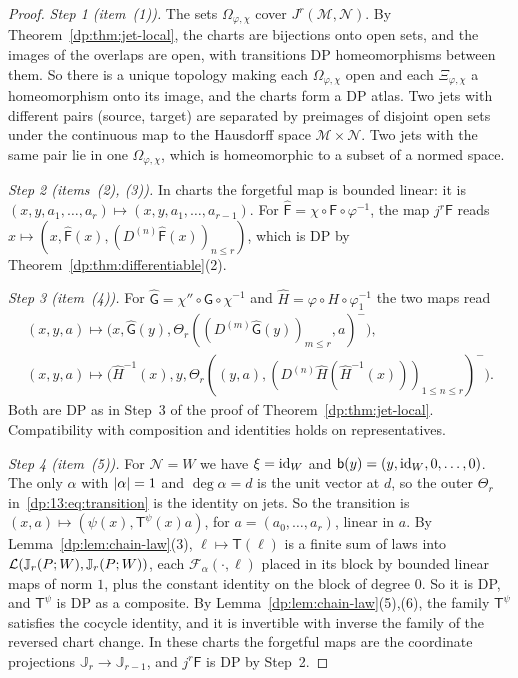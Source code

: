 \begin{proof}
\emph{Step 1 (item~(1)).} The sets $\Omega_{\varphi,\chi}$ cover $J^r(\mathcal M,\mathcal N)$. By Theorem~\ref{dp:thm:jet-local}, the charts are bijections onto open sets, and the images of the overlaps are open, with transitions DP homeomorphisms between them. So there is a unique topology making each $\Omega_{\varphi,\chi}$ open and each $\Xi_{\varphi,\chi}$ a homeomorphism onto its image, and the charts form a DP atlas. Two jets with different pairs (source, target) are separated by preimages of disjoint open sets under the continuous map to the Hausdorff space $\mathcal M\times\mathcal N$. Two jets with the same pair lie in one $\Omega_{\varphi,\chi}$, which is homeomorphic to a subset of a normed space.

\emph{Step 2 (items~(2), (3)).} In charts the forgetful map is bounded linear: it is $(x,y,a_1,\dots,a_r)\mapsto(x,y,a_1,\dots,a_{r-1})$. For $\hat{\mathsf F}=\chi\circ\mathsf F\circ\varphi^{-1}$, the map $j^r\mathsf F$ reads $x\mapsto(x,\hat{\mathsf F}(x),(D^{(n)}\hat{\mathsf F}(x))_{n\le r})$, which is DP by Theorem~\ref{dp:thm:differentiable}(2).

\emph{Step 3 (item~(4)).} For $\hat{\mathsf G}=\chi''\circ\mathsf G\circ\chi^{-1}$ and $\hat H=\varphi\circ H\circ\varphi_1^{-1}$ the two maps read
\begin{gather*}
 (x,y,a)\mapsto\bigl(x,\hat{\mathsf G}(y),\Theta_r((D^{(m)}\hat{\mathsf G}(y))_{m\le r},a)^-\bigr),\\
 (x,y,a)\mapsto\bigl(\hat H^{-1}(x),y,\Theta_r((y,a),(D^{(n)}\hat H(\hat H^{-1}(x)))_{1\le n\le r})^-\bigr).
\end{gather*}
Both are DP as in Step~3 of the proof of Theorem~\ref{dp:thm:jet-local}. Compatibility with composition and identities holds on representatives.

\emph{Step 4 (item~(5)).} For $\mathcal N=W$ we have $\xi=\mathrm{id}_W$ and $\mathsf b(y)=(y,\mathrm{id}_W,0,\dots,0)$. The only $\alpha$ with $\lvert \alpha\rvert=1$ and $\deg\alpha=d$ is the unit vector at $d$, so the outer $\Theta_r$ in~\eqref{dp:13:eq:transition} is the identity on jets. So the transition is $(x,a)\mapsto(\psi(x),\mathsf T^\psi(x)a)$, for $a=(a_0,\dots,a_r)$, linear in $a$. By Lemma~\ref{dp:lem:chain-law}(3), $\ell\mapsto\mathsf T(\ell)$ is a finite sum of laws into $\mathcal L(\mathbb J_r(P;W),\mathbb J_r(P;W))$, each $\mathcal F_\alpha({\cdot},\ell)$ placed in its block by bounded linear maps of norm $1$, plus the constant identity on the block of degree $0$. So it is DP, and $\mathsf T^\psi$ is DP as a composite. By Lemma~\ref{dp:lem:chain-law}(5),(6), the family $\mathsf T^\psi$ satisfies the cocycle identity, and it is invertible with inverse the family of the reversed chart change. In these charts the forgetful maps are the coordinate projections $\mathbb J_r\to\mathbb J_{r-1}$, and $j^r\mathsf F$ is DP by Step~2.
\end{proof}

